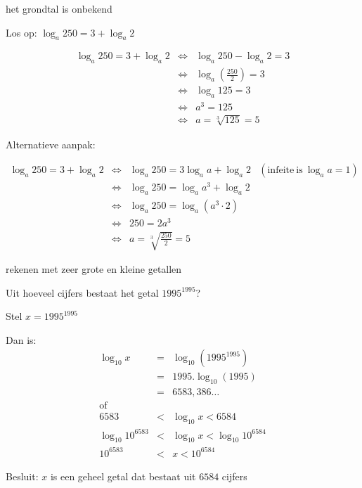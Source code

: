 \begin{voorbeeld} 
	het grondtal is onbekend

Los op: $\log_{a}250=3+\log_{a}2$


\begin{equation*}
 \begin{array}{rcl}
  \log_{a}250=3+\log_{a}2
	&\iff &  \log_{a}250-\log_{a}2 = 3\\
	&\iff &  \log_{a}\left(\frac{250}{2}\right) = 3 \\
	&\iff &  \log_{a}125 = 3\\
	&\iff & a^{3} = 125\\
	&\iff & a = \sqrt[3]{125}=5
	\end{array}
\end{equation*}


Alternatieve aanpak:


\begin{equation*}
\begin{array}{rclr}
	\log_{a}250=3+\log_{a}2
	&\iff & \log_{a}250 = 3\log_{a}a+\log_{a}2 & (\textrm{infeite}\:\textrm{is}\:\log_{a}a=1)\\
	&\iff &  \log_{a}250 = \log_{a}a^{3}+\log_{a}2 & \text{}\\
	&\iff &  \log_{a}250 = \log_{a}\left(a^{3}\cdot 2\right)&\\
	&\iff & 250 = 2a^{3}&\\
	&\iff & a = \sqrt[3]{\frac{250}{2}}=5&
\end{array}
\end{equation*}

\end{voorbeeld}

\begin{voorbeeld}
rekenen met zeer grote en kleine getallen

Uit hoeveel cijfers bestaat het getal $ 1995^{1995}$?

Stel $ x=1995^{1995}$ 

Dan is: 
\begin{eqnarray*}
	\log_{10}x & = & \log_{10}\left(1995^{1995}\right)\\
	& = & 1995.\log_{10}\left(1995\right)\\
	& = & 6583,386\ldots \\
	\text{of} && \\
	 6583&<&\log_{10}x<6584\\
	\log_{10}10^{6583}&<&\log_{10}x<\log_{10}10^{6584}\\
	10^{6583}&<&x<10^{6584}
	\end{eqnarray*}

%


Besluit: $x$ is een geheel getal dat bestaat uit $6584$ cijfers

\end{voorbeeld}

